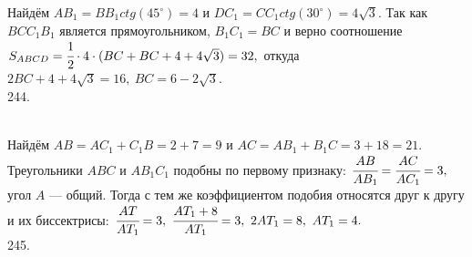 \documentclass[12pt]{article}
\begin{document}
Найдём $AB_1=BB_1 ctg(45^\circ)=4$ и $DC_1=CC_1 ctg(30^\circ)=4\sqrt{3}.$ Так как $BCC_1B_1$ является прямоугольником, $B_1C_1=BC$ и верно соотношение
$S_{ABCD}=\cfrac{1}{2}\cdot4\cdot(BC+BC+4+4\sqrt{3})=32,$ откуда $2BC+4+4\sqrt{3}=16,\ BC=6-2\sqrt{3}.$\\
244. \begin{figure}[ht!]
\end{figure}\\
Найдём $AB=AC_1+C_1B=2+7=9$ и $AC=AB_1+B_1C=3+18=21.$ Треугольники $ABC$ и $AB_1C_1$ подобны по первому признаку: $\cfrac{AB}{AB_1}=\cfrac{AC}{AC_1}=3,$ угол $A$ --- общий. Тогда с тем же коэффициентом подобия относятся друг к другу и их биссектрисы: $\cfrac{AT}{AT_1}=3,\ \cfrac{AT_1+8}{AT_1}=3,\ 2AT_1=8,\ AT_1=4.$\\
245. \begin{figure}[ht!]
\end{figure}\\
\end{document}
